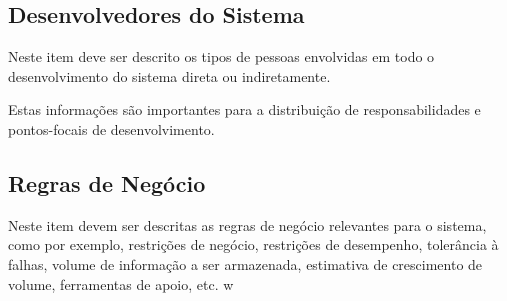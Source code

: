 \subsection{Desenvolvedores do Sistema}

Neste item deve ser descrito os tipos de pessoas envolvidas em todo o desenvolvimento do sistema direta ou indiretamente.

Estas informações são importantes para a distribuição de responsabilidades e pontos-focais de desenvolvimento.

\subsection{Regras de Negócio}

Neste item devem ser descritas as regras de negócio relevantes para o sistema, como por exemplo, restrições de negócio, restrições de desempenho, tolerância à falhas, volume de informação a ser armazenada, estimativa de crescimento de volume, ferramentas de apoio, etc.
w
